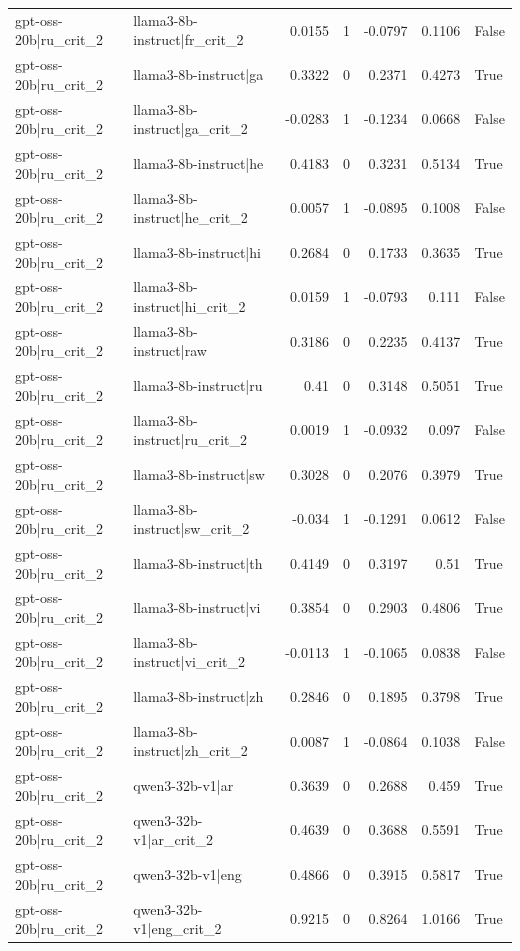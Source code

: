 \begin{table}
\begin{tabular}{l l r r r r l}
gpt-oss-20b|ru_crit_2 & llama3-8b-instruct|fr_crit_2 & 0.0155 & 1 & -0.0797 & 0.1106 & False \\
gpt-oss-20b|ru_crit_2 & llama3-8b-instruct|ga & 0.3322 & 0 & 0.2371 & 0.4273 & True \\
gpt-oss-20b|ru_crit_2 & llama3-8b-instruct|ga_crit_2 & -0.0283 & 1 & -0.1234 & 0.0668 & False \\
gpt-oss-20b|ru_crit_2 & llama3-8b-instruct|he & 0.4183 & 0 & 0.3231 & 0.5134 & True \\
gpt-oss-20b|ru_crit_2 & llama3-8b-instruct|he_crit_2 & 0.0057 & 1 & -0.0895 & 0.1008 & False \\
gpt-oss-20b|ru_crit_2 & llama3-8b-instruct|hi & 0.2684 & 0 & 0.1733 & 0.3635 & True \\
gpt-oss-20b|ru_crit_2 & llama3-8b-instruct|hi_crit_2 & 0.0159 & 1 & -0.0793 & 0.111 & False \\
gpt-oss-20b|ru_crit_2 & llama3-8b-instruct|raw & 0.3186 & 0 & 0.2235 & 0.4137 & True \\
gpt-oss-20b|ru_crit_2 & llama3-8b-instruct|ru & 0.41 & 0 & 0.3148 & 0.5051 & True \\
gpt-oss-20b|ru_crit_2 & llama3-8b-instruct|ru_crit_2 & 0.0019 & 1 & -0.0932 & 0.097 & False \\
gpt-oss-20b|ru_crit_2 & llama3-8b-instruct|sw & 0.3028 & 0 & 0.2076 & 0.3979 & True \\
gpt-oss-20b|ru_crit_2 & llama3-8b-instruct|sw_crit_2 & -0.034 & 1 & -0.1291 & 0.0612 & False \\
gpt-oss-20b|ru_crit_2 & llama3-8b-instruct|th & 0.4149 & 0 & 0.3197 & 0.51 & True \\
gpt-oss-20b|ru_crit_2 & llama3-8b-instruct|vi & 0.3854 & 0 & 0.2903 & 0.4806 & True \\
gpt-oss-20b|ru_crit_2 & llama3-8b-instruct|vi_crit_2 & -0.0113 & 1 & -0.1065 & 0.0838 & False \\
gpt-oss-20b|ru_crit_2 & llama3-8b-instruct|zh & 0.2846 & 0 & 0.1895 & 0.3798 & True \\
gpt-oss-20b|ru_crit_2 & llama3-8b-instruct|zh_crit_2 & 0.0087 & 1 & -0.0864 & 0.1038 & False \\
gpt-oss-20b|ru_crit_2 & qwen3-32b-v1|ar & 0.3639 & 0 & 0.2688 & 0.459 & True \\
gpt-oss-20b|ru_crit_2 & qwen3-32b-v1|ar_crit_2 & 0.4639 & 0 & 0.3688 & 0.5591 & True \\
gpt-oss-20b|ru_crit_2 & qwen3-32b-v1|eng & 0.4866 & 0 & 0.3915 & 0.5817 & True \\
gpt-oss-20b|ru_crit_2 & qwen3-32b-v1|eng_crit_2 & 0.9215 & 0 & 0.8264 & 1.0166 & True \\

\end{tabular}
\end{table}
